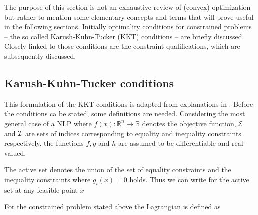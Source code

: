 The purpose of this section is not an exhaustive review of (convex) optimization but rather to mention
some elementary concepts and terms that will prove useful in the following sections. Initially optimality
conditions for constrained problems -- the so called Karush-Kuhn-Tucker (KKT)
conditions -- are briefly discussed. Closely linked to those conditions are the constraint qualifications, 
which are subsequently discussed.

    \subsection{Karush-Kuhn-Tucker conditions}
    \label{sec:opt:theory:kkt}
    This formulation of the KKT conditions is adapted from explanations in \cite{Nocedal.2006}.
    Before the conditions ca be stated, some definitions are needed. Considering the most general case of a NLP
    where $f(x): \mathbb{R}^n \mapsto \mathbb{R}$ denotes the objective function, $\mathcal{E}$ and $\mathcal{I}$
    are sets of indices corresponding to equality and inequality constraints respectively.
    the functions $f, g$ and $h$ are assumed to be differentiable and real-valued.

    The active set denotes the union of the set of equality constraints and the inequality constraints
    where $g_i(x) = 0$ holds. Thus we can write for the active set at any feasible point $x$

    For the constrained problem stated above the Lagrangian is defined as

